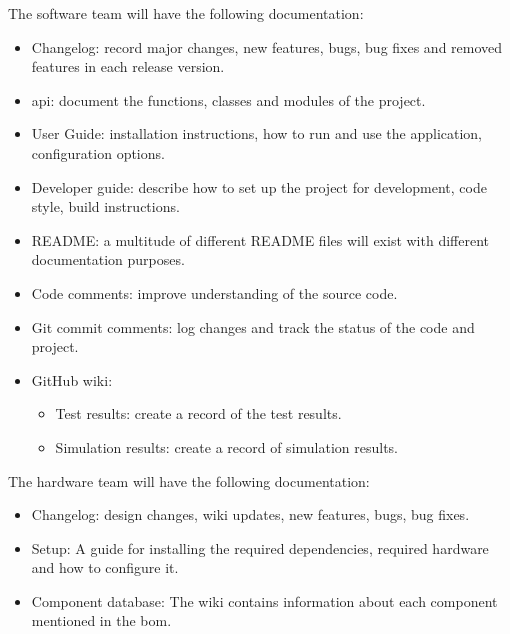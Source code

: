 The software team will have the following documentation:
\begin{itemize}
    \item Changelog: record major changes, new features, bugs, bug fixes and removed features in each release version.
    \item \acs{api}: document the functions, classes and modules of the project.
    \item User Guide: installation instructions, how to run and use the application, configuration options.
    \item Developer guide: describe how to set up the project for development, code style, build instructions.
    \item README: a multitude of different README files will exist with different documentation purposes.
    \item Code comments: improve understanding of the source code.
    \item Git commit comments: log changes and track the status of the code and project.
    \item GitHub wiki: 
    \begin{itemize}
        \item Test results: create a record of the test results.
        \item Simulation results: create a record of simulation results.
    \end{itemize}
\end{itemize}

The hardware team will have the following documentation:
\begin{itemize}
    \item Changelog: design changes, wiki updates, new features, bugs, bug fixes.
    \item Setup: A guide for installing the required dependencies, required hardware and how to configure it.
    \item Component database: The wiki contains information about each component mentioned in the \ac{bom}.
\end{itemize}



